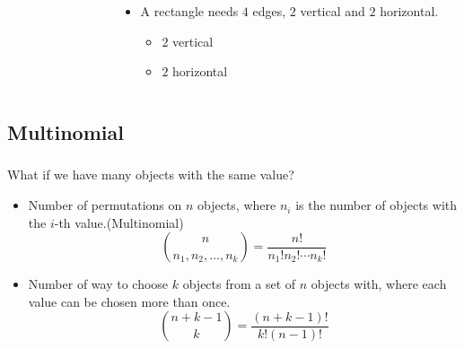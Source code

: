 \documentclass[10pt]{beamer}
\newcommand{\bi}{\begin{itemize}}
\newcommand{\ei}{\end{itemize}}
\begin{document}
\begin{frame}
\begin{columns}
\begin{column}{.3\textwidth}
{\begin{figure}
\begin{tabular}{|c|c!{\color{hilight}\vrule}c|c|c!{\color{hilight}\vrule}c|}
          & & & & & \\ \hline
        \end{tabular}
      \end{figure}}
    \end{column}
    \begin{column}{0.8\textwidth}
      \bi
        \item A rectangle needs $4$ edges, $2$ vertical and $2$ horizontal.
          \bi
            \item $2$ vertical
            \item $2$ horizontal
          \ei
      \ei
    \end{column}
  \end{columns}
\end{frame}

\subsection{Multinomial}
\begin{frame}
  \vspace{20pt}
  \frametitle{\insertsubsection}
  What if we have many objects with the same value?
  \bi
    \item Number of permutations on $n$ objects, where $n_i$ is the number of
      objects with the $i$-th value.(Multinomial)
      \[
        \binom{n}{n_1,n_2,\ldots,n_k} = \frac{n!}{n_1!n_2!\cdots n_k!}
      \]
    \item Number of way to choose $k$ objects from a set of $n$ objects with, where each value can be chosen more than once.
      \[
        \binom{n + k - 1}{k} = \frac{(n + k - 1)!}{k!(n-1)!}
      \]
  \ei
\end{frame}
\end{document}
